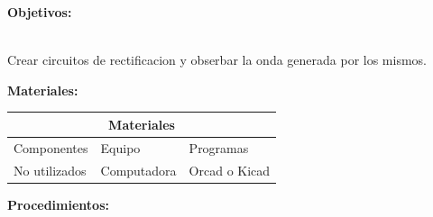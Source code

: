 ﻿\documentclass[letterpaper]{article}
\begin{document}
\newpage










    \begin{LARGE}
            \textbf{Objetivos:}\\
    \end{LARGE}
         \begin{large}
           \\ Crear circuitos de rectificacion y obserbar la onda generada por los mismos.

         \end{large}
\vspace{2cm}
    
    
    
    
    
    
    
    
    
        \begin{LARGE}
            \textbf{Materiales:}\\
         \end{LARGE}
    \begin{large}
      \begin{table}[htbt]
      \centering
      \begin{tabular}{|l|l|l|}
      \hline
      \multicolumn{3}{|c|}{Materiales}\\ \hline
      Componentes & Equipo & Programas\\
      \hline \hline
          No utilizados & Computadora & Orcad o Kicad\\ \hline
      \end{tabular}
      
      \end{table}
            
    \end{large}
    \vspace{1.2cm}
    
    
         \begin{LARGE}
            \textbf{Procedimientos:}\\
         \end{LARGE}
         
         
         
         
         
\end{document}
